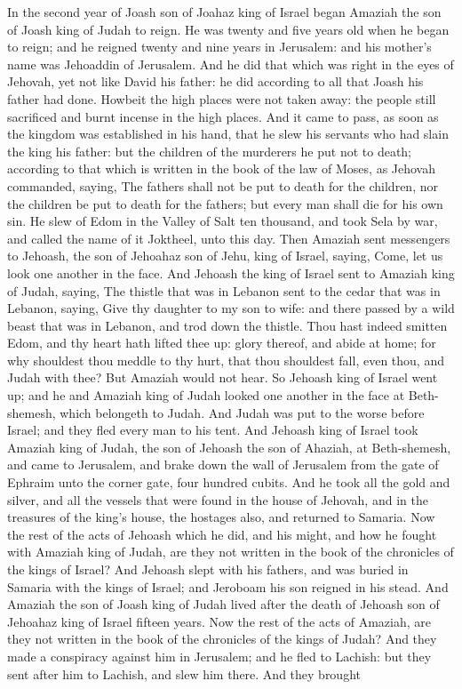 In the second year of Joash son of Joahaz king of Israel began Amaziah the son of Joash king of Judah to reign. He was twenty and five years old when he began to reign; and he reigned twenty and nine years in Jerusalem: and his mother’s name was Jehoaddin of Jerusalem. And he did that which was right in the eyes of Jehovah, yet not like David his father: he did according to all that Joash his father had done. Howbeit the high places were not taken away: the people still sacrificed and burnt incense in the high places. And it came to pass, as soon as the kingdom was established in his hand, that he slew his servants who had slain the king his father: but the children of the murderers he put not to death; according to that which is written in the book of the law of Moses, as Jehovah commanded, saying, The fathers shall not be put to death for the children, nor the children be put to death for the fathers; but every man shall die for his own sin. He slew of Edom in the Valley of Salt ten thousand, and took Sela by war, and called the name of it Joktheel, unto this day.  Then Amaziah sent messengers to Jehoash, the son of Jehoahaz son of Jehu, king of Israel, saying, Come, let us look one another in the face. And Jehoash the king of Israel sent to Amaziah king of Judah, saying, The thistle that was in Lebanon sent to the cedar that was in Lebanon, saying, Give thy daughter to my son to wife: and there passed by a wild beast that was in Lebanon, and trod down the thistle. Thou hast indeed smitten Edom, and thy heart hath lifted thee up: glory thereof, and abide at home; for why shouldest thou meddle to thy hurt, that thou shouldest fall, even thou, and Judah with thee?  But Amaziah would not hear. So Jehoash king of Israel went up; and he and Amaziah king of Judah looked one another in the face at Beth-shemesh, which belongeth to Judah. And Judah was put to the worse before Israel; and they fled every man to his tent. And Jehoash king of Israel took Amaziah king of Judah, the son of Jehoash the son of Ahaziah, at Beth-shemesh, and came to Jerusalem, and brake down the wall of Jerusalem from the gate of Ephraim unto the corner gate, four hundred cubits. And he took all the gold and silver, and all the vessels that were found in the house of Jehovah, and in the treasures of the king’s house, the hostages also, and returned to Samaria.  Now the rest of the acts of Jehoash which he did, and his might, and how he fought with Amaziah king of Judah, are they not written in the book of the chronicles of the kings of Israel? And Jehoash slept with his fathers, and was buried in Samaria with the kings of Israel; and Jeroboam his son reigned in his stead.  And Amaziah the son of Joash king of Judah lived after the death of Jehoash son of Jehoahaz king of Israel fifteen years. Now the rest of the acts of Amaziah, are they not written in the book of the chronicles of the kings of Judah? And they made a conspiracy against him in Jerusalem; and he fled to Lachish: but they sent after him to Lachish, and slew him there. And they brought 